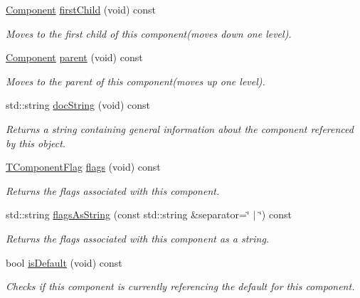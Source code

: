 \begin{DoxyCompactItemize}
\hyperlink{classmv_i_m_p_a_c_t_1_1acquire_1_1_component}{Component} \hyperlink{classmv_i_m_p_a_c_t_1_1acquire_1_1_component_aaf5cfd9177e1d002b501a85df253096b}{first\+Child} (void) const 
\begin{DoxyCompactList}\small\item\em Moves to the first child of this component(moves down one level). \end{DoxyCompactList}\item 
\hyperlink{classmv_i_m_p_a_c_t_1_1acquire_1_1_component}{Component} \hyperlink{classmv_i_m_p_a_c_t_1_1acquire_1_1_component_a07b183818aad835e54066780413de330}{parent} (void) const 
\begin{DoxyCompactList}\small\item\em Moves to the parent of this component(moves up one level). \end{DoxyCompactList}\item 
std\+::string \hyperlink{classmv_i_m_p_a_c_t_1_1acquire_1_1_component_a322ecaa2c5c86e07a31d0771f2c31683}{doc\+String} (void) const 
\begin{DoxyCompactList}\small\item\em Returns a string containing general information about the component referenced by this object. \end{DoxyCompactList}\item 
\hyperlink{group___common_interface_ga4ef1be7cf1ca9dd256fd3060dd0787bb}{T\+Component\+Flag} \hyperlink{classmv_i_m_p_a_c_t_1_1acquire_1_1_component_a92f9a75ca9a56430e172c00b29b5496f}{flags} (void) const 
\begin{DoxyCompactList}\small\item\em Returns the flags associated with this component. \end{DoxyCompactList}\item 
std\+::string \hyperlink{classmv_i_m_p_a_c_t_1_1acquire_1_1_component_a4d650124bdad64f378a7b71a647d8e9b}{flags\+As\+String} (const std\+::string \&separator=\char`\"{} $\vert$ \char`\"{}) const 
\begin{DoxyCompactList}\small\item\em Returns the flags associated with this component as a string. \end{DoxyCompactList}\item 
bool \hyperlink{classmv_i_m_p_a_c_t_1_1acquire_1_1_component_ae5ea06015da01ed640f4a357d90326f9}{is\+Default} (void) const 
\begin{DoxyCompactList}\small\item\em Checks if this component is currently referencing the default for this component. \end{DoxyCompactList}\item 

\end{DoxyCompactItemize}
